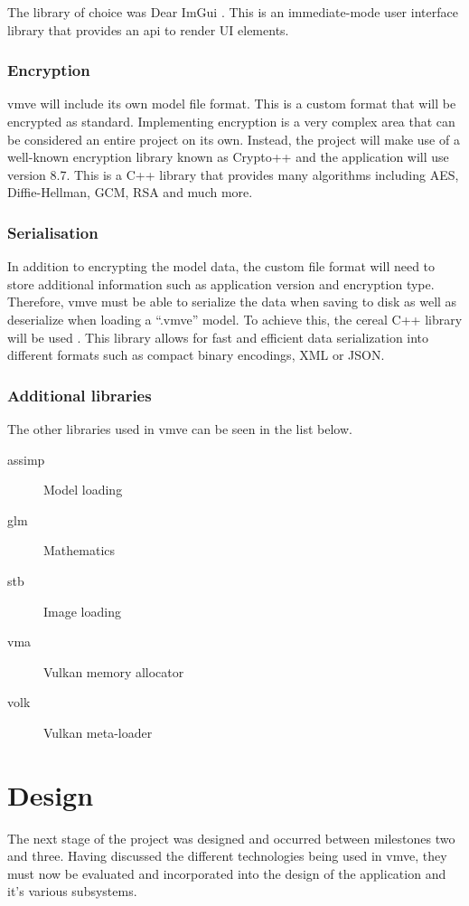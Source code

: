 \documentclass[11pt]{article}
\begin{document}
The library of choice was Dear ImGui \cite{imgui}. This is an immediate-mode
user interface library that provides an \gls*{api} to render UI elements. 

\subsubsection{Encryption} \label{custom_file_format} \gls*{vmve} will include
its own model file format. This is a custom format that will be encrypted as
standard. Implementing encryption is a very complex area that can be considered
an entire project on its own. Instead, the project will make use of a well-known
encryption library known as Crypto++ \cite{cryptopp} and the application will
use version 8.7. This is a C++ library that provides many algorithms including
AES, Diffie-Hellman, GCM, RSA and much more.

\subsubsection{Serialisation}
In addition to encrypting the model data, the custom file format will need to
store additional information such as application version and encryption type.
Therefore, \gls*{vmve} must be able to serialize the data when saving to disk as
well as deserialize when loading a ``.vmve'' model. To achieve this, the cereal
C++ library will be used \cite{cereal}. This library allows for fast and
efficient data serialization into different formats such as compact binary
encodings, XML or JSON.

\subsubsection{Additional libraries}
The other libraries used in \gls*{vmve} can be seen in the list below.
\begin{description}
  \item[assimp] Model loading
  \item[glm] Mathematics
  \item[stb] Image loading
  \item[vma] Vulkan memory allocator
  \item[volk] Vulkan meta-loader
\end{description}

\clearpage
\section{Design}
The next stage of the project was designed and occurred between milestones two
and three. Having discussed the different technologies being used in
\gls*{vmve}, they must now be evaluated and incorporated into the design of the
application and it's various subsystems.
\end{document}
